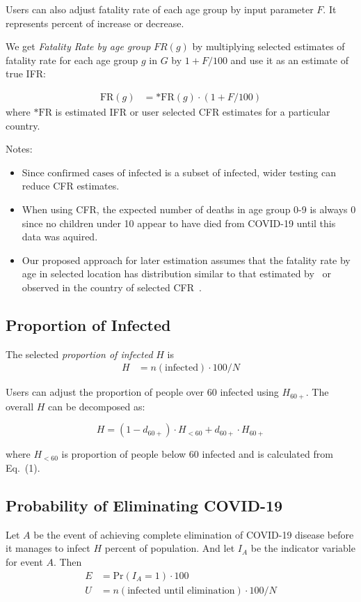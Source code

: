 \documentclass[12pt]{article}
\begin{document}
Users can also adjust fatality rate of each age group by input parameter $F$. It represents percent of increase or decrease.

We get {\it Fatality Rate by age group} $FR(g)$ by multiplying selected estimates of fatality rate for each age group $g$ in $G$ by $1 + F/100$ and use it as an estimate of true IFR:

\begin{align*}
\text{FR}(g) &=
   \text{*FR}(g) \cdot (1 + F/100)
\end{align*}
where $\text{*FR}$ is estimated IFR or user selected CFR estimates for a particular country.

Notes:
\begin{itemize}
\item Since $\text{confirmed cases of infected}$ is a subset of $\text{infected}$, wider testing can reduce CFR estimates.
\item When using CFR, the expected number of deaths in age group 0-9 is always 0 since no children under 10 appear to have died from COVID-19 until this data was aquired.
\item Our proposed approach for later estimation assumes that the fatality rate by age in selected location has distribution similar to that estimated by~\cite{imperial} or observed in the country of selected CFR~\cite{cfrs}.
\end{itemize}

\subsection*{Proportion of Infected}
The selected {\it proportion of infected} $H$ is
\begin{align*}
H &= n(\text{infected}) \cdot 100 / N
\end{align*}


Users can adjust the proportion of people over 60 infected using $H_{60+}$. The overall $H$ can be decomposed as:

\begin{equation*}
	H = (1 - d_{60+}) \cdot H_{<60} + d_{60+} \cdot H_{60+}
	\tag{1}
\end{equation*}

where $H_{<60}$ is proportion of people below 60 infected and is calculated from Eq.~(1).

\subsection*{Probability of Eliminating COVID-19}
Let $A$ be the event of achieving complete elimination of COVID-19 disease before it manages to infect $H$ percent of population. And let $I_{A}$ be the indicator variable for event $A$. Then
\begin{align*}
E &= \text{Pr}(I_{A} = 1) \cdot 100 \\
U &= n(\text{infected until elimination}) \cdot 100 / N
\end{align*}
\end{document}
